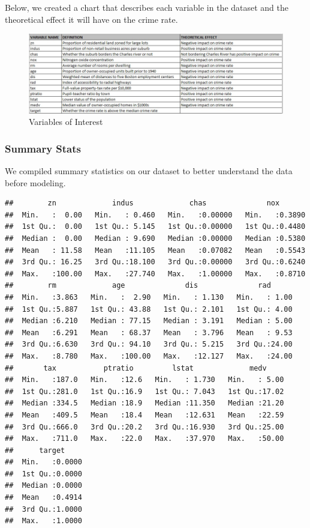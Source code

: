\documentclass[
]{article}
\begin{document}
Below, we created a chart that describes each variable in the dataset
and the theoretical effect it will have on the crime rate.

\begin{figure}
\centering
\includegraphics{./images/theoretical_effects.jpg}
\caption{Variables of Interest}
\end{figure}

\hypertarget{summary-stats}{%
\subsubsection{Summary Stats}\label{summary-stats}}

We compiled summary statistics on our dataset to better understand the
data before modeling.

\begin{verbatim}
##        zn             indus             chas              nox        
##  Min.   :  0.00   Min.   : 0.460   Min.   :0.00000   Min.   :0.3890  
##  1st Qu.:  0.00   1st Qu.: 5.145   1st Qu.:0.00000   1st Qu.:0.4480  
##  Median :  0.00   Median : 9.690   Median :0.00000   Median :0.5380  
##  Mean   : 11.58   Mean   :11.105   Mean   :0.07082   Mean   :0.5543  
##  3rd Qu.: 16.25   3rd Qu.:18.100   3rd Qu.:0.00000   3rd Qu.:0.6240  
##  Max.   :100.00   Max.   :27.740   Max.   :1.00000   Max.   :0.8710  
##        rm             age              dis              rad       
##  Min.   :3.863   Min.   :  2.90   Min.   : 1.130   Min.   : 1.00  
##  1st Qu.:5.887   1st Qu.: 43.88   1st Qu.: 2.101   1st Qu.: 4.00  
##  Median :6.210   Median : 77.15   Median : 3.191   Median : 5.00  
##  Mean   :6.291   Mean   : 68.37   Mean   : 3.796   Mean   : 9.53  
##  3rd Qu.:6.630   3rd Qu.: 94.10   3rd Qu.: 5.215   3rd Qu.:24.00  
##  Max.   :8.780   Max.   :100.00   Max.   :12.127   Max.   :24.00  
##       tax           ptratio         lstat             medv      
##  Min.   :187.0   Min.   :12.6   Min.   : 1.730   Min.   : 5.00  
##  1st Qu.:281.0   1st Qu.:16.9   1st Qu.: 7.043   1st Qu.:17.02  
##  Median :334.5   Median :18.9   Median :11.350   Median :21.20  
##  Mean   :409.5   Mean   :18.4   Mean   :12.631   Mean   :22.59  
##  3rd Qu.:666.0   3rd Qu.:20.2   3rd Qu.:16.930   3rd Qu.:25.00  
##  Max.   :711.0   Max.   :22.0   Max.   :37.970   Max.   :50.00  
##      target      
##  Min.   :0.0000  
##  1st Qu.:0.0000  
##  Median :0.0000  
##  Mean   :0.4914  
##  3rd Qu.:1.0000  
##  Max.   :1.0000
\end{verbatim}
\end{document}
